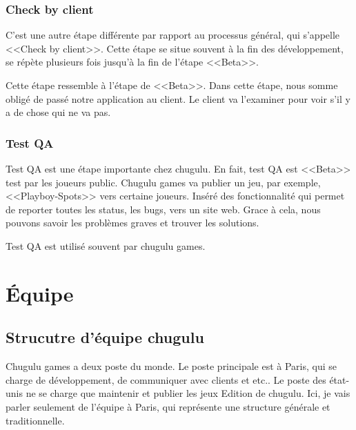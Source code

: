 
\subsubsection{Check by client} %
\label{ssub:check_by_client}

C'est une autre étape différente par rapport au processus général, qui s'appelle <<Check by client>>. Cette étape se situe souvent à la fin des développement, se répète plusieurs fois jusqu'à la fin de l'étape <<Beta>>. 

Cette étape ressemble à l'étape de <<Beta>>. Dans cette étape, nous somme obligé de passé notre application au client. Le client va l'examiner pour voir s'il y a de chose qui ne va pas.


\subsubsection{Test QA} %
\label{ssub:test_qa}

Test QA est une étape importante chez chugulu. En fait, test QA est <<Beta>> test par les joueurs public. Chugulu games va publier un jeu, par exemple, <<Playboy-Spots>> vers certaine joueurs. Inséré des fonctionnalité qui permet de reporter toutes les status, les bugs, vers un site web. Grace à cela, nous pouvons savoir les problèmes graves et trouver les solutions.

Test QA est utilisé souvent par chugulu games.  


\section{Équipe} %
\label{sec:Équipe}


\subsection{Strucutre d'équipe chugulu} %
\label{sub:strucutre_d_équipe_chugulu}


Chugulu games a deux poste du monde. Le poste principale est à Paris, qui se charge de développement, de communiquer avec clients et etc.. Le poste des état-unis ne se charge que maintenir et publier les jeux Edition de chugulu. Ici, je vais parler seulement de l'équipe à Paris, qui représente une structure générale et traditionnelle.

